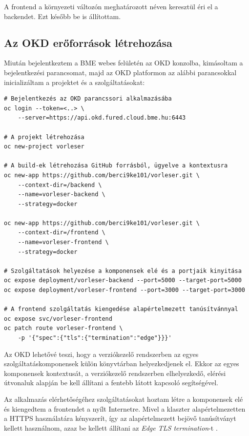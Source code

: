 \documentclass[12pt]{article}
\begin{document}
 	A frontend a  környezeti változón meghatározott néven keresztül éri el a backendet. Ezt később be is állítottam.
	
	\subsection{Az OKD erőforrások létrehozása}
	
	Miután bejelentkeztem a BME webes felületén az OKD konzolba, kimásoltam a bejelentkezési parancsomat, majd az OKD platformon az alábbi parancsokkal inicializáltam a projektet és a szolgáltatásokat:
	
	\begin{verbatim}
# Bejelentkezés az OKD parancssori alkalmazásába
oc login --token=<..> \
	--server=https://api.okd.fured.cloud.bme.hu:6443

# A projekt létrehozása
oc new-project vorleser

# A build-ek létrehozása GitHub forrásból, ügyelve a kontextusra
oc new-app https://github.com/berci9ke101/vorleser.git \
	--context-dir=/backend \
	--name=vorleser-backend \
	--strategy=docker

oc new-app https://github.com/berci9ke101/vorleser.git \
	--context-dir=/frontend \
	--name=vorleser-frontend \
	--strategy=docker

# Szolgáltatások helyezése a komponensek elé és a portjaik kinyitása
oc expose deployment/vorleser-backend --port=5000 --target-port=5000
oc expose deployment/vorleser-frontend --port=3000 --target-port=3000

# A frontend szolgáltatás kiengedése alapértelmezett tanúsítvánnyal
oc expose svc/vorleser-frontend
oc patch route vorleser-frontend \
	-p '{"spec":{"tls":{"termination":"edge"}}}'
	\end{verbatim}
	
	Az OKD lehetővé teszi, hogy a verziókezelő rendszerben az egyes szolgáltatáskomponensek külön könyvtárban helyezkedjenek el. Ekkor az egyes komponensek kontextusát, a verziókezelő rendszerben elhelyezkedő, elérési útvonaluk alapján be kell állítani a fentebb látott  kapcsoló segítségével.
	
	Az alkalmazás elérhetőségéhez szolgáltatásokat hoztam létre a komponensek elé és kiengedtem a frontendet a nyílt Internetre. Mivel a klaszter alapértelmezetten a HTTPS használatára kényszerít, így az alapértelmezett bejövő tanúsítványt kellett használnom, azaz be kellett állítani az \textit{Edge TLS termination}-t \cite{okd-edge-termination}.
	
\end{document}
